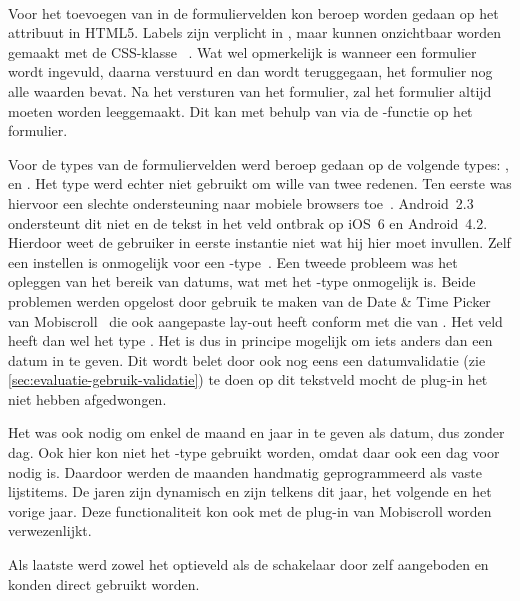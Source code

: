 \paragraph{\jqm} 
Voor het toevoegen van  in de formuliervelden kon beroep worden gedaan op het attribuut in HTML5. 
Labels zijn verplicht in \jqm{}, maar kunnen onzichtbaar worden gemaakt met de CSS-klasse ~\cite{JQuery2013}. 
Wat wel opmerkelijk is wanneer een formulier wordt ingevuld, daarna verstuurd en dan wordt teruggegaan, het formulier nog alle waarden bevat. 
Na het versturen van het formulier, zal het formulier altijd moeten worden leeggemaakt. 
Dit kan met behulp van \js{} via de -functie op het formulier.
 
Voor de types van de formuliervelden werd beroep gedaan op de volgende types: ,  en . 
Het  type werd echter niet gebruikt om wille van twee redenen.
Ten eerste was hiervoor een slechte ondersteuning naar mobiele browsers toe~\cite{Deveria2013c}.
Android~2.3 ondersteunt dit niet en de tekst in het veld ontbrak op iOS~6 en Android~4.2.
Hierdoor weet de gebruiker in eerste instantie niet wat hij hier moet invullen. 
Zelf een  instellen is onmogelijk voor een -type~\cite{Berjon2012}. 
Een tweede probleem was het opleggen van het bereik van datums, wat met het -type onmogelijk is. 
Beide problemen werden opgelost door gebruik te maken van de Date \& Time Picker van Mobiscroll~\cite{Mobiscroll2013} die ook aangepaste lay-out heeft conform met die van \jqm{}. 
Het veld heeft dan wel het type .
Het is dus in principe mogelijk om iets anders dan een datum in te geven. 
Dit wordt belet door ook nog eens een datumvalidatie (zie \ref{sec:evaluatie-gebruik-validatie}) te doen op dit tekstveld mocht de plug-in het niet hebben afgedwongen.
 
Het was ook nodig om enkel de maand en jaar in te geven als datum, dus zonder dag.
Ook hier kon niet het -type gebruikt worden, omdat daar ook een dag voor nodig is. 
Daardoor werden de maanden handmatig geprogrammeerd als vaste lijstitems. 
De jaren zijn dynamisch en zijn telkens dit jaar, het volgende en het vorige jaar. 
Deze functionaliteit kon ook met de plug-in van Mobiscroll worden verwezenlijkt.

Als laatste werd zowel het optieveld als de schakelaar door \jqm{} zelf aangeboden en konden direct gebruikt worden. 
 
